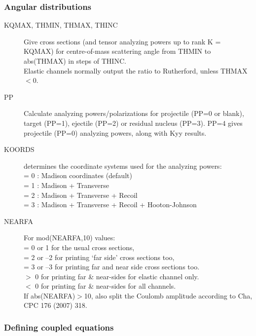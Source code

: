 \documentclass[11pt]{article}
\begin{document}
\subsubsection{Angular distributions}

\begin{description}

\item[KQMAX, THMIN, THMAX, THINC]

Give cross sections (and tensor analyzing powers up to rank K = KQMAX)
for centre-of-mass scattering angle from THMIN
to abs(THMAX) in steps of THINC.\\
Elastic channels normally output the ratio to Rutherford, unless THMAX $< 0$.

\item[PP]
Calculate analyzing powers/polarizations for projectile (PP=0 or blank),
target (PP=1), ejectile (PP=2) or residual nucleus (PP=3).
PP=4 gives projectile (PP=0) analyzing powers, along with Kyy results.

\item[KOORDS ]determines the coordinate systems used for the analyzing powers:
\\  = 0 : Madison coordinates (default)
\\  = 1 : Madison + Transverse
\\  = 2 : Madison + Transverse + Recoil
\\  = 3 : Madison + Transverse + Recoil + Hooton-Johnson

\item[NEARFA]
For mod(NEARFA,10) values: 
\\ = 0 or 1 for the usual cross sections,
\\  = 2 or --2 for printing `far side' cross sections too,
\\  = 3 or --3 for printing far and near side cross sections too.
\\  $>$ 0 for printing far \& near-sides for elastic channel only.
\\  $<$ 0 for printing far \& near-sides for all channels.\\
If abs(NEARFA)$>$10, also split the Coulomb amplitude according to Cha, CPC 176 (2007) 318.

\end{description}

\subsubsection{Defining coupled equations}
\end{document}
